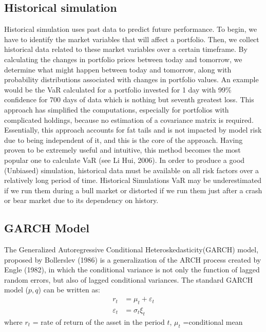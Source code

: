 \documentclass[a4paper,11pt,oneside]{book}
\begin{document}
\subsection{Historical simulation}

Historical simulation uses past data to predict future performance. To begin, we have to identify the market variables that will affect a portfolio. Then, we collect historical data related to these market variables over a certain timeframe. By calculating the changes in portfolio prices between today and tomorrow, we determine what might happen between today and tomorrow, along with probability distributions associated with changes in portfolio values. An example would be the VaR calculated for a portfolio invested for 1 day with 99\% confidence for 700 days of data which is nothing but seventh greatest loss.
\newline\newline This approach has simplified the computations, especially for portfolios with complicated holdings, because no estimation of a covariance matrix is required.\newline\newline
Essentially, this approach accounts for fat tails and is not impacted by model risk due to being independent of it, and this is the core of the approach. Having proven to be extremely useful and intuitive, this method becomes the most popular one to calculate VaR (see Li Hui, 2006). In order to produce a good (Unbiased) simulation, historical data must be available on all risk factors over a relatively long period of time. Historical Simulations VaR may be underestimated if we run them during a bull market or distorted if we run them just after a crash or bear market due to its dependency on history.
\subsection{GARCH Model}
The Generalized Autoregressive Conditional Heteroskedasticity(GARCH) model, proposed by Bollerslev
(1986) is a generalization of the ARCH process created by
Engle (1982), in which the conditional variance is not only
the function of lagged random errors, but also of lagged
conditional variances. The standard GARCH model ($p,q$)
can be written as:
\begin{equation}
\begin{aligned}
r_t &= \mu_t + \varepsilon_t
\\
\varepsilon_t &= \sigma_t \xi_t 
\label{6}
\end{aligned}
\end{equation}
where $r_t$ = rate of return of the asset in the period $t$,\newline
$\mu_t$ =conditional mean \newline
\end{document}
